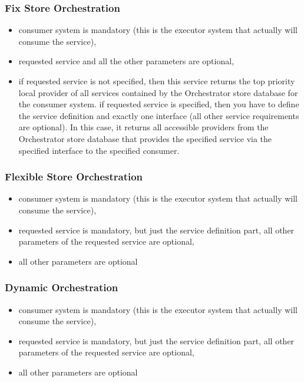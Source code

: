 \documentclass[a4paper]{arrowhead}
\begin{document}
\subsubsection{Fix Store Orchestration}

\begin{itemize}
    \item consumer system is mandatory (this is the executor system that actually will consume the service),
    \item requested service and all the other parameters are optional,
    \item if requested service is not specified, then this service returns the top priority local provider of all services contained by the Orchestrator store database for the consumer system. if requested service is specified, then you have to define the service definition and exactly one interface (all other service requirements are optional). In this case, it returns all accessible providers from the Orchestrator store database that provides the specified service via the specified interface to the specified consumer.
\end{itemize}

\subsubsection{Flexible Store Orchestration}

\begin{itemize}
    \item consumer system is mandatory (this is the executor system that actually will consume the service),
    \item requested service is mandatory, but just the service definition part, all other parameters of the requested service are optional,
    \item all other parameters are optional
\end{itemize}    

\subsubsection{Dynamic Orchestration}

\begin{itemize}
    \item consumer system is mandatory (this is the executor system that actually will consume the service),
    \item requested service is mandatory, but just the service definition part, all other parameters of the requested service are optional,
    \item all other parameters are optional
\end{itemize}    
    
\end{document}
